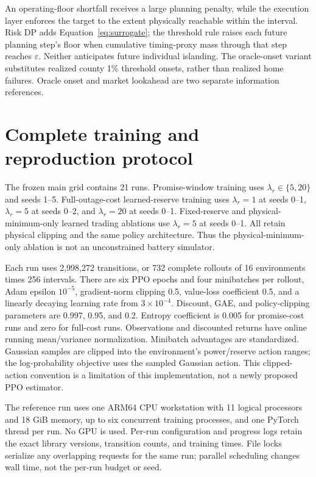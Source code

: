 An operating-floor shortfall receives a large planning penalty, while the execution layer enforces the target to the extent physically reachable within the interval. Risk DP adds Equation~\eqref{eq:surrogate}; the threshold rule raises each future planning step's floor when cumulative timing-proxy mass through that step reaches $\varepsilon$. Neither anticipates future individual islanding. The oracle-onset variant substitutes realized county 1\% threshold onsets, rather than realized home failures. Oracle onset and market lookahead are two separate information references.

\section{Complete training and reproduction protocol}
\label{app:repro}

The frozen main grid contains 21 runs. Promise-window training uses $\lambda_r\in\{5,20\}$ and seeds 1--5. Full-outage-cost learned-reserve training uses $\lambda_r=1$ at seeds 0--1, $\lambda_r=5$ at seeds 0--2, and $\lambda_r=20$ at seeds 0--1. Fixed-reserve and physical-minimum-only learned trading ablations use $\lambda_r=5$ at seeds 0--1. All retain physical clipping and the same policy architecture. Thus the physical-minimum-only ablation is not an unconstrained battery simulator.

Each run uses 2,998,272 transitions, or 732 complete rollouts of 16 environments times 256 intervals. There are six PPO epochs and four minibatches per rollout, Adam epsilon $10^{-5}$, gradient-norm clipping 0.5, value-loss coefficient 0.5, and a linearly decaying learning rate from $3\times10^{-4}$. Discount, GAE, and policy-clipping parameters are 0.997, 0.95, and 0.2. Entropy coefficient is 0.005 for promise-cost runs and zero for full-cost runs. Observations and discounted returns have online running mean/variance normalization. Minibatch advantages are standardized. Gaussian samples are clipped into the environment's power/reserve action ranges; the log-probability objective uses the sampled Gaussian action. This clipped-action convention is a limitation of this implementation, not a newly proposed PPO estimator.

The reference run uses one ARM64 CPU workstation with 11 logical processors and 18 GiB memory, up to six concurrent training processes, and one PyTorch thread per run. No GPU is used. Per-run configuration and progress logs retain the exact library versions, transition counts, and training times. File locks serialize any overlapping requests for the same run; parallel scheduling changes wall time, not the per-run budget or seed.


